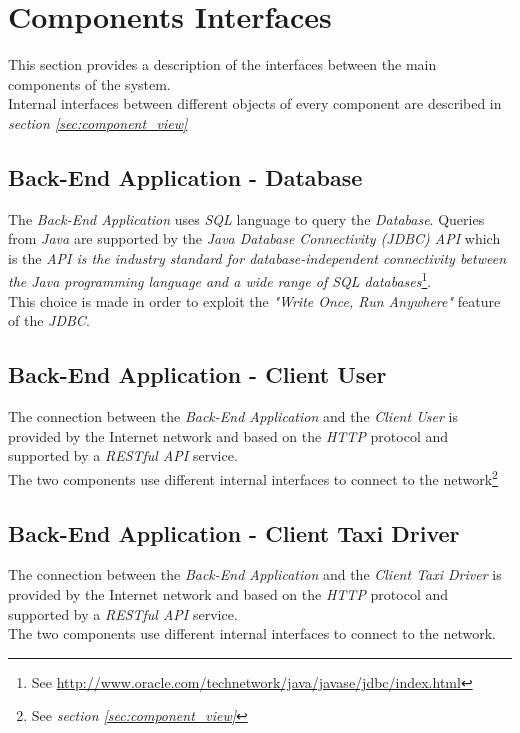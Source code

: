 \section{Components Interfaces} %
\label{sec:components_interfaces}
This section provides a description of the interfaces between the main components of the system.\\
Internal interfaces between different objects of every component are described in \emph{section \ref{sec:component_view}}
\subsection{Back-End Application - Database} %
\label{sub:back_end_application_database}
The \emph{Back-End Application} uses \emph{SQL} language to query the \emph{Database}. Queries from \emph{Java} are supported by the \emph{Java Database Connectivity (JDBC) API} which is the \emph{API is the industry standard for database-independent connectivity between the Java programming language and a wide range of SQL databases}\footnote{See \url{http://www.oracle.com/technetwork/java/javase/jdbc/index.html}}.\\
This choice is made in order to exploit the \emph{"Write Once, Run Anywhere"} feature of the \emph{JDBC}.
\subsection{Back-End Application - Client User} %
\label{sub:back_end_application_client_user}
The connection between the \emph{Back-End Application} and the \emph{Client User} is provided by the Internet network and based on the \emph{HTTP} protocol and supported by a \emph{RESTful API} service.\\
The two components use different internal interfaces to connect to the network\footnote{See \emph{section \ref{sec:component_view}}}
\subsection{Back-End Application - Client Taxi Driver} %
\label{sub:back_end_application_client_taxi}
The connection between the \emph{Back-End Application} and the \emph{Client Taxi Driver} is provided by the Internet network and based on the \emph{HTTP} protocol and supported by a \emph{RESTful API} service.\\
The two components use different internal interfaces to connect to the network.

